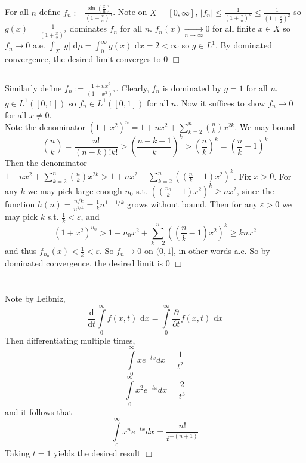 \documentclass{article}
\begin{document}
\section{}
\subsection{}
For all $n$ define $f_n := \frac{\sin \left( \frac{x}{n}\right)}{\left(1 + \frac{x}{n}\right)^n}$. Note on $X = [0,\infty]$, $|f_n| \leq \frac{1}{\left(1 + \frac{x}{n}\right)^n} \leq \frac{1}{\left(1 + \frac{x}{2}\right)^2}$ so $g(x) = \frac{1}{\left(1 + \frac{x}{2}\right)^2}$ dominates $f_n$ for all $n$. $f_n(x) \xrightarrow[n\to\infty]{} 0$ for all finite $x \in X$ so $f_n \to 0$ a.e. $\int_X |g| \textrm{ d}\mu = \int_0^\infty g(x) \textrm{ d}x = 2 < \infty$ so $g \in L^1$. By dominated convergence, the desired limit converges to 0 $\Box$

\subsection{}
Similarly define $f_n := \frac{1+nx^2}{\left(1+x^2\right)^n}$. Clearly, $f_n$ is dominated by $g = 1$ for all $n$. $g \in L^1([0,1])$ so $f_n \in L^1([0,1])$ for all $n$. Now it suffices to show $f_n \to 0$ for all $x \neq 0$.\\
Note the denominator $(1+x^2)^n = 1 + nx^2 + \sum\limits_{k=2}^n \binom{n}{k}x^{2k}$. We may bound
$$\binom{n}{k} = \frac{n!}{(n-k)!k!} > \left(\frac{n-k+1}{k}\right)^k > \left(\frac{n}{k}\right)^k = \left(\frac{n}{k} - 1\right)^k$$
Then the denominator $1 + nx^2 + \sum\limits_{k=2}^n \binom{n}{k}x^{2k} > 1 + nx^2 + \sum\limits_{k=2}^n \left((\frac{n}{k}-1)x^2\right)^k$. Fix $x > 0$. For any $k$ we may pick large enough $n_0$ s.t. $\left((\frac{n_0}{k}-1)x^2 \right)^k \geq nx^2$, since the function $h(n) = \frac{n/k}{n^{1/k}} = \frac{1}{k}n^{1-1/k}$ grows without bound. Then for any $\varepsilon > 0$ we may pick $k$ s.t. $\frac{1}{k} < \varepsilon$, and
$$(1+x^2)^{n_0} > 1 + n_0x^2 + \sum\limits_{k=2}^n \left((\frac{n}{k}-1)x^2\right)^k \geq knx^2$$
and thus $f_{n_0}(x) < \frac{1}{k} < \varepsilon$. So $f_n \to 0$ on $(0,1]$, in other words a.e. So by dominated convergence, the desired limit is 0 $\Box$

\section{}
\subsection{}
Note by Leibniz,
$$\frac{\textrm{d}}{\textrm{d}t} \int\limits_0^\infty f(x,t) \textrm{ d}x = \int\limits_0^\infty \frac{\partial}{\partial t}f(x,t) \textrm{ d}x$$
Then differentiating multiple times,
$$\int\limits_0^\infty xe^{-tx} dx = \frac{1}{t^2}$$
$$\int\limits_0^\infty x^2e^{-tx} dx = \frac{2}{t^3}$$
and it follows that
$$\int\limits_0^\infty x^ne^{-tx} dx = \frac{n!}{t^{-(n+1)}}$$
Taking $t = 1$ yields the desired result $\Box$
\end{document}
